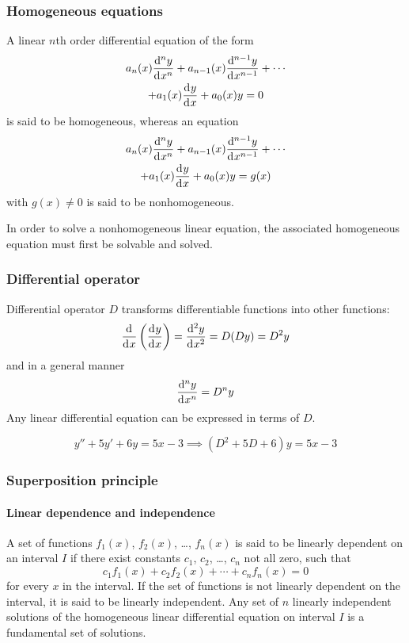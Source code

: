 \documentclass[10pt, twocolumn]{article}
\theoremstyle{definition}
\begin{document}
\subsubsection*{Homogeneous equations}
A linear \(n\)th order differential equation of the form
\begin{multline*}
  a_n (x)\frac{\mathrm{d}^{n} y}{\mathrm{d}^{} x^{n}} + a_{n - 1}(x)\frac{\mathrm{d}^{n - 1} y}{\mathrm{d}^{} x^{n - 1}} + \cdots \\
  + a_1 (x)\frac{\mathrm{d}^{} y}{\mathrm{d}^{} x} + a_0 (x)y = 0
\end{multline*}
is said to be homogeneous, whereas an equation
\begin{multline*}
  a_n (x)\frac{\mathrm{d}^{n} y}{\mathrm{d}^{} x^{n}} + a_{n - 1}(x)\frac{\mathrm{d}^{n - 1} y}{\mathrm{d}^{} x^{n - 1}} + \cdots \\
  + a_1 (x)\frac{\mathrm{d}^{} y}{\mathrm{d}^{} x} + a_0 (x)y = g(x)
\end{multline*}
with \(g(x) \neq 0\) is said to be nonhomogeneous.

In order to solve a nonhomogeneous linear equation, the associated homogeneous equation must first be solvable and solved.


\subsubsection*{Differential operator}
Differential operator \(D\) transforms differentiable functions into other functions:
\[
  \frac{\mathrm{d}^{}}{\mathrm{d}^{} x} \left( \frac{\mathrm{d}^{} y}{\mathrm{d}^{} x} \right) = \frac{\mathrm{d}^{2} y}{\mathrm{d}^{} x^{2}} = D(Dy) = D^2 y
\]
and in a general manner
\[
  \frac{\mathrm{d}^{n} y}{\mathrm{d}^{} x^{n}} = D^n y
\]
Any linear differential equation can be expressed in terms of \(D\).
\begin{example}
  \[
    y'' + 5y' + 6y = 5x - 3 \implies \left( D^2 + 5D + 6 \right)y = 5x - 3
  \]
\end{example}


\subsubsection*{Superposition principle}
\paragraph*{Linear dependence and independence}
A set of functions \(f_1 (x)\), \(f_2 (x)\), \dots, \(f_n (x)\) is said to be linearly dependent on an interval \(I\) if there exist constants \(c_1 \), \(c_2 \), \dots, \(c_n \) not all zero, such that
\[
  c_1 f_1 (x) + c_2 f_2 (x) + \cdots + c_n f_n (x) = 0
\]
for every \(x\) in the interval.
If the set of functions is not linearly dependent on the interval, it is said to be linearly independent.
Any set of \(n\) linearly independent solutions of the homogeneous linear differential equation on interval \(I\) is a fundamental set of solutions.
\end{document}
